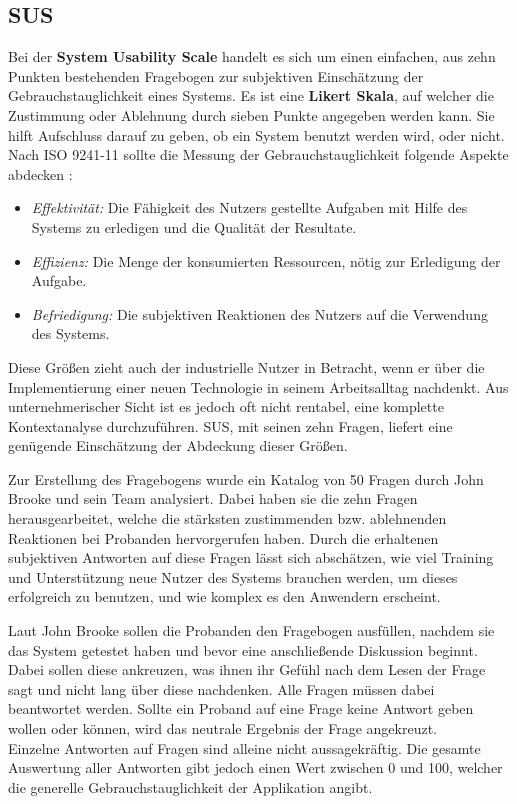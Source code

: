 \subsection{SUS}

Bei der \textbf{System Usability Scale} handelt es sich um einen einfachen, aus zehn Punkten bestehenden Fragebogen zur subjektiven Einschätzung der Gebrauchstauglichkeit eines Systems. Es ist eine \textbf{Likert Skala}, auf welcher die Zustimmung oder Ablehnung durch sieben Punkte angegeben werden kann. Sie hilft Aufschluss darauf zu geben, ob ein System benutzt werden wird, oder nicht. \\
Nach ISO 9241-11 sollte die Messung der Gebrauchstauglichkeit folgende Aspekte abdecken \cite{brooke_sus_nodate}:

\begin{itemize}
	\item \textit{Effektivität:} Die Fähigkeit des Nutzers gestellte Aufgaben mit Hilfe des Systems zu erledigen und die Qualität der Resultate.
	\item \textit{Effizienz:} Die Menge der konsumierten Ressourcen, nötig zur Erledigung der Aufgabe.
	\item \textit{Befriedigung:} Die subjektiven Reaktionen des Nutzers auf die Verwendung des Systems.
\end{itemize}

Diese Größen zieht auch der industrielle Nutzer in Betracht, wenn er über die Implementierung einer neuen Technologie in seinem Arbeitsalltag nachdenkt. Aus unternehmerischer Sicht ist es jedoch oft nicht rentabel, eine komplette Kontextanalyse durchzuführen. SUS, mit seinen zehn Fragen, liefert eine genügende Einschätzung der Abdeckung dieser Größen.

Zur Erstellung des Fragebogens wurde ein Katalog von 50 Fragen durch John Brooke und sein Team analysiert. Dabei haben sie die zehn Fragen herausgearbeitet, welche die stärksten zustimmenden bzw. ablehnenden Reaktionen bei Probanden hervorgerufen haben. Durch die erhaltenen subjektiven Antworten auf diese Fragen lässt sich abschätzen, wie viel Training und Unterstützung neue Nutzer des Systems brauchen werden, um dieses erfolgreich zu benutzen, und wie komplex es den Anwendern erscheint.

Laut John Brooke \cite{brooke_sus_nodate} sollen die Probanden den Fragebogen ausfüllen, nachdem sie das System getestet haben und bevor eine anschließende Diskussion beginnt. Dabei sollen diese ankreuzen, was ihnen ihr Gefühl nach dem Lesen der Frage sagt und nicht lang über diese nachdenken. Alle Fragen müssen dabei beantwortet werden. Sollte ein Proband auf eine Frage keine Antwort geben wollen oder können, wird das neutrale Ergebnis der Frage angekreuzt. \\
Einzelne Antworten auf Fragen sind alleine nicht aussagekräftig. Die gesamte Auswertung aller Antworten gibt jedoch einen Wert zwischen 0 und 100, welcher die generelle Gebrauchstauglichkeit der Applikation angibt.

